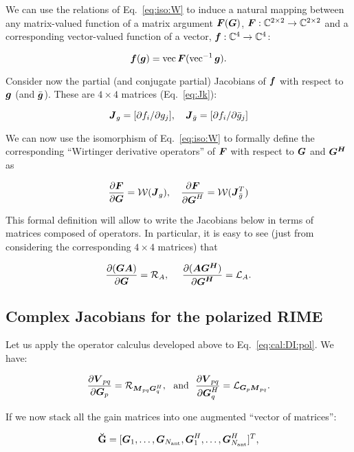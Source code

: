 \documentclass[useAMS,usenatbib]{mn2e}
\newcommand{\COMPLEX}{\mathbb{C}}
\newcommand{\mat}[1]{{\bmath{#1}}}
\newcommand{\JJ}{\mat{J}} %
\newcommand{\MM}{\mat{M}}
\newcommand{\VV}{\mat{V}}
\newcommand{\GG}{\mat{G}}
\begin{document}
We can use the relations of Eq.~\ref{eq:iso:W} to induce a natural mapping between any matrix-valued function of a 
matrix argument $\mat{F}(\mat{G})$, $\mat{F}:\COMPLEX^{2\times2}\to\COMPLEX^{2\times2}$ and a corresponding 
vector-valued function of a vector, $\bmath{f}:\COMPLEX^4\to\COMPLEX^4$:

\[
\bmath{f}(\bmath{g}) = \VEC{\mat{F}(\VECINV{\bmath{g}})}.
\]

Consider now the partial (and conjugate partial) Jacobians of $\bmath{f}$ with respect to $\bmath{g}$ 
(and $\bar{\bmath{g}}$). These are $4\times4$ matrices (Eq.~\ref{eq:Jk}):

\[
\JJ_g = [ \partial f_i / \partial g_j ],~~~\JJ_{\bar{g}} = [ \partial f_i / \partial \bar{g}_j ]
\]

We can now use the isomorphism of Eq.~\ref{eq:iso:W} to formally define the corresponding ``Wirtinger derivative operators'' 
of $\mat{F}$ with respect to $\mat{G}$ and $\mat{G^H}$ as

\begin{equation}
\label{eq:def:dF:dG}
\frac{\partial\mat{F}}{\partial{\mat{G}}} = \mathcal{W}(\JJ_g),~~~
\frac{\partial\mat{F}}{\partial{\mat{G}^H}} = \mathcal{W}(\JJ_{\bar{g}}^T)
\end{equation}

This formal definition will allow to write the Jacobians below in terms of matrices composed of operators. 
In particular, it is easy to see (just from considering the corresponding $4\times4$ matrices) that

\[
\frac{\partial(\mat{GA})}{\partial{\mat{G}}} = \Rop{A},~~~~\frac{\partial(\mat{AG^H})}{\partial{\mat{G^H}}} = \Lop{A}.
\]

\subsection{Complex Jacobians for the polarized RIME}

Let us apply the operator calculus developed above to Eq.~\ref{eq:cal:DI:pol}. We have:

\begin{equation}
\label{eq:dR:dG}
\frac{\partial\VV_{pq}}{\partial\GG_p} = \Rop{\MM_{pq}\GG^H_q},\mathrm{~~and~~}
\frac{\partial\VV_{pq}}{\partial\GG^H_q} = \Lop{\GG_p \MM_{pq}}.
\end{equation}

If we now stack all the gain matrices into one augmented ``vector of matrices'':

\begin{equation}
\label{eq:GGvec}
\GGg = [ \GG_1,\dots,\GG_{\scriptstyle \Na},\GG^H_1,\dots,\GG^H_{\scriptstyle \Na} ]^T,
\end{equation}
\end{document}
